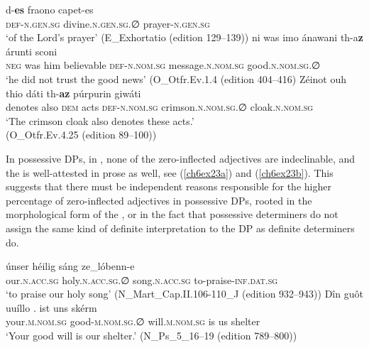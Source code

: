 \documentclass[output=paper,colorlinks,citecolor=brown]{langscibook}
\begin{document}
\begin{exe}
\ex\label{ch6ex22}\begin{xlist}
\ex\label{ch6ex22a}
\gll d-\textbf{es} fraono capet-es\\
\textsc{def-n.gen.sg} divine.\textsc{n.gen.sg.∅} prayer-\textsc{n.gen.sg}\\
\glt `of the Lord's prayer' (E\_Exhortatio (edition 129--139))
\ex\label{ch6ex22b} 
\gll ni was imo ánawani th-a\textbf{z} árunti sconi\\
\textsc{neg} was him believable \textsc{def-n.nom.sg} message.\textsc{n.nom.sg} good.\textsc{n.nom.sg.∅}\\
\glt `he did not trust the good news' (O\_Otfr.Ev.1.4 (edition 404--416)
\ex\label{ch6ex22c} 
\gll Zéinot ouh thio dáti th-\textbf{az} púrpurin giwáti\\
denotes also \textsc{dem} acts \textsc{def-n.nom.sg} crimson.\textsc{n.nom.sg.∅} cloak.\textsc{n.nom.sg}\\
\glt `The crimson cloak also denotes these acts.'\\ (O\_Otfr.Ev.4.25 (edition 89--100))
\end{xlist}
\end{exe}

In possessive DPs, in , none of the zero-inflected adjectives are
indeclinable, and the  is well-attested in prose as well, see
(\ref{ch6ex23a}) and (\ref{ch6ex23b}). This suggests that there must be independent reasons
responsible for the higher percentage of zero-inflected adjectives in
possessive DPs, rooted in the morphological form of the , or in
the fact that possessive determiners do not assign the same kind of
definite interpretation to the DP as definite determiners do.

\begin{exe}
\ex\label{ch6ex23}\begin{xlist}
\ex\label{ch6ex23a}
\gll únser héilig sáng ze\_lóbenn-e\\
our.\textsc{n.acc.sg} holy.\textsc{n.acc.sg.∅} song.\textsc{n.acc.sg} to-praise-\textsc{inf.dat.sg}\\
\glt `to praise our holy song' (N\_Mart\_Cap.II.106-110\_J (edition 932--943))
\ex\label{ch6ex23b} 
\gll Dîn guôt uuíllo . ist uns skérm\\
your.\textsc{m.nom.sg} good-\textsc{m.nom.sg.∅} will.\textsc{m.nom.sg} {} is us shelter\\
\glt `Your good will is our shelter.' (N\_Ps\_5\_16--19 (edition 789--800))
\end{xlist}
\end{exe}
\end{document}
